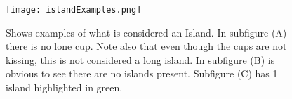         \begin{figure}[H]
            \centering
            \texttt{[image: islandExamples.png]}
            \caption{Shows examples of what is considered an Island. In subfigure (A) there is no lone cup. Note also that even though the cups are not kissing, this is not considered a long island. In subfigure (B) is obvious to see there are no islands present. Subfigure (C) has 1 island highlighted in green.}
            \label{fig:islandExamples}
        \end{figure}